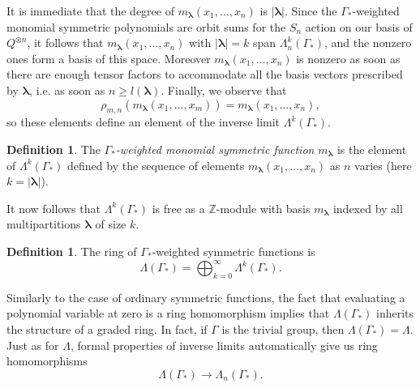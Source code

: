 \documentclass[10pt]{article}
\theoremstyle{definition}
\newtheorem{definition}[theorem]{Definition}
\newcommand{\bs}{\boldsymbol}
\newcommand{\LambdaG}{\Lambda(\Gamma_*)}
\begin{document}
It is immediate that the degree of $m_{\bs\lambda}(x_1, \ldots, x_n)$ is $|\bs\lambda|$. Since the $\Gamma_*$-weighted monomial symmetric polynomials are orbit sums for the $S_n$ action on our basis of $Q^{\otimes n}$, it follows that $m_{\bs\lambda}(x_1, \ldots, x_n)$ with $|\bs\lambda|=k$ span $\Lambda_{n}^k(\Gamma_*)$, and the nonzero ones form a basis of this space. Moreover $m_{\bs\lambda}(x_1, \ldots, x_n)$ is nonzero as soon as there are enough tensor factors to accommodate all the basis vectors prescribed by $\bs \lambda$, i.e. as soon as $n \geq l(\bs\lambda)$. Finally, we observe that
\[
\rho_{m,n}(m_{\bs\lambda}(x_1,\ldots, x_m)) = m_{\bs\lambda}(x_1,\ldots, x_n),
\]
so these elements define an element of the inverse limit $\Lambda^k(\Gamma_*)$.
\begin{definition}
The \emph{$\Gamma_*$-weighted monomial symmetric function} $m_{\bs\lambda}$ is the element of $\Lambda^k(\Gamma_*)$ defined by the sequence of elements $m_{\bs\lambda}(x_1, \dots, x_n)$ as $n$ varies \textup{(}here $k = |\bs\lambda|$\textup{)}.
\end{definition}

It now follows that $\Lambda^k(\Gamma_*)$ is free as a $\mathbb{Z}$-module with basis $m_{\bs\lambda}$ indexed by all multipartitions $\bs\lambda$ of size $k$.
\begin{definition}
The ring of $\Gamma_*$-weighted symmetric functions is
\[
\LambdaG = \bigoplus_{k=0}^{\infty} \Lambda^k(\Gamma_*).
\]
\end{definition}

Similarly to the case of ordinary symmetric functions, the fact that evaluating a polynomial variable at zero is a ring homomorphism implies that $\LambdaG$ inherits the structure of a graded ring. In fact, if $\Gamma$ is the trivial group, then $\LambdaG = \Lambda$. Just as for $\Lambda$, formal properties of inverse limits automatically give us ring homomorphisms
\[
\LambdaG \to \Lambda_n(\Gamma_*).
\]
\end{document}
